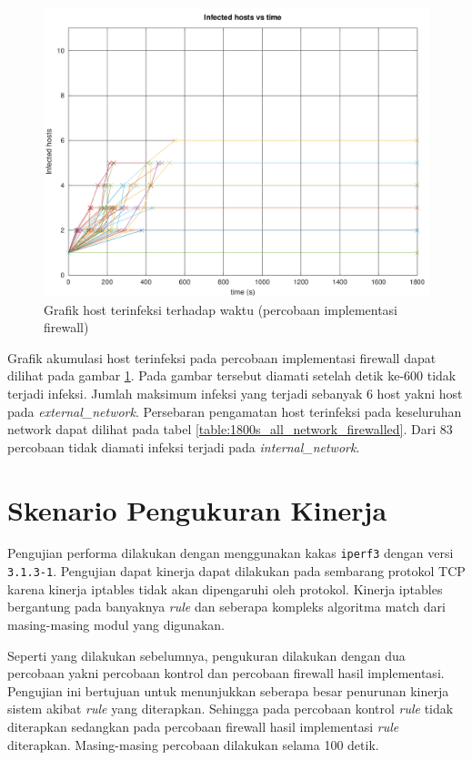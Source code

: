 \begin{figure}[H]
	\centering
	\includegraphics[width=\textwidth]{resources/infection_control_over_time_firewalled.png}
	\caption{Grafik host terinfeksi terhadap waktu (percobaan implementasi firewall)}
	\label{fig:infection_control_over_time_firewalled}
\end{figure}

Grafik akumulasi host terinfeksi pada percobaan implementasi firewall dapat dilihat pada gambar \ref{fig:infection_control_over_time_firewalled}. Pada gambar tersebut diamati setelah detik ke-600 tidak terjadi infeksi. Jumlah maksimum infeksi yang terjadi sebanyak 6 host yakni host pada \textit{external\_network}. Persebaran pengamatan host terinfeksi pada keseluruhan network dapat dilihat pada tabel \ref{table:1800s_all_network_firewalled}. Dari 83 percobaan tidak diamati infeksi terjadi pada \textit{internal\_network}.

\section{Skenario Pengukuran Kinerja}

Pengujian performa dilakukan dengan menggunakan kakas \verb|iperf3| dengan versi \verb|3.1.3-1|. Pengujian dapat kinerja dapat dilakukan pada sembarang protokol TCP karena kinerja iptables tidak akan dipengaruhi oleh protokol. Kinerja iptables bergantung pada banyaknya \textit{rule} dan seberapa kompleks algoritma match dari masing-masing modul yang digunakan.

Seperti yang dilakukan sebelumnya, pengukuran dilakukan dengan dua percobaan yakni percobaan kontrol dan percobaan firewall hasil implementasi. Pengujian ini bertujuan untuk menunjukkan seberapa besar penurunan kinerja sistem akibat \textit{rule} yang diterapkan. Sehingga pada percobaan kontrol \textit{rule} tidak diterapkan sedangkan pada percobaan firewall hasil implementasi \textit{rule} diterapkan. Masing-masing percobaan dilakukan selama 100 detik. 

